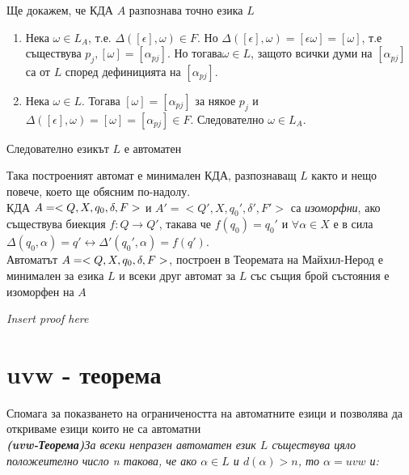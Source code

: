 \documentclass[11pt]{article} %
\begin{document}
Ще докажем, че КДА $A$ разпознава точно езика $L$\\
\renewcommand{\theenumi}{\alph{enumi}}

\begin{enumerate}
	\item Нека $\omega \in L_{A}$, т.е. $\Delta([\epsilon], \omega) \in F. \text{ Но } \Delta([\epsilon], \omega) = [\epsilon \omega] = [\omega]$, т.е съществува $p_{j}, [\omega] = 					[\alpha_{pj}]$. Но тогава$\omega \in L$, защото всички думи 			на $[\alpha_{pj}]$ са от $L$ според дефиницията на $					[\alpha_{pj}]$.\\
	\item Нека $\omega \in L$. Тогава $[\omega] = [\alpha_{pj}]$ за някое $p_{j}$ и $\Delta([\epsilon], \omega) = [\omega] = [\alpha_{pj}]\in F$. Следователно $\omega \in L_{A}$. \\
\end{enumerate}\par

	Следователно езикът $L$ е автоматен \par
	Така построеният автомат е минимален КДА, разпознаващ $L$ както и нещо повече, което ще обясним по-надолу.\\
	 КДА $A = <Q, X, q_{0}, \delta, F>$ и $A' = < Q', X, q_{0}', \delta', F'>$ са \emph{изоморфни}, ако съществува биекция $f : Q \to Q'$, такава че $f(q_{0}) = q_{0}'$ и $\forall \alpha \in X$ е в сила $\Delta(q_{0}, \alpha) = q' \leftrightarrow \Delta'(q_{0}', \alpha) = f(q')$. \\
	\theorem Автоматът $A = <Q, X, q_{0}, \delta, F>$, построен в Теоремата на Майхил-Нерод е минимален за езика $L$ и всеки друг автомат за $L$ със същия брой състояния е изоморфен на $A$\\
	\centerline{\emph{Insert proof here}}

\section{uvw - теорема}
Спомага за показването на ограничеността на автоматните езици  и позволява да откриваме езици които не са автоматни\\
\theorem \emph{\textbf{(uvw-Теорема)}За всеки непразен автоматен език $L$ съществува цяло положеително число n такова, че ако $\alpha \in L$ и $d(\alpha) > n$, то $\alpha = uvw$ и:}\\   
\renewcommand{\theenumi}{\arabic{enumi}}
\end{document}
